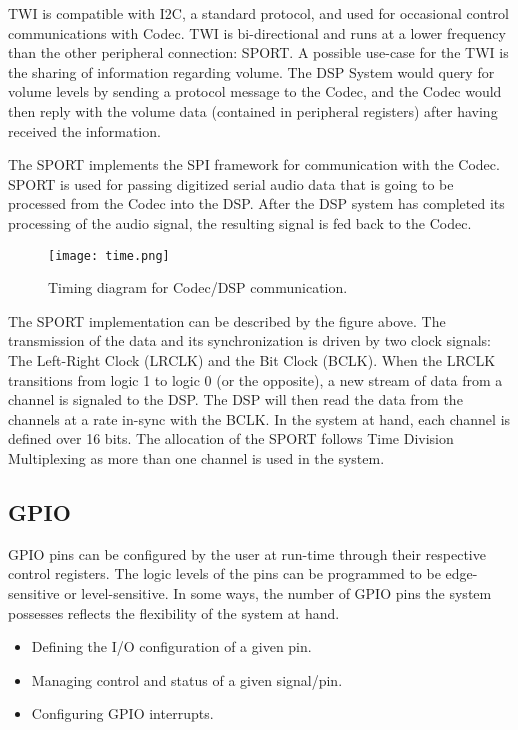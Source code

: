 TWI is compatible with I2C, a standard protocol, and used for occasional control communications with Codec. TWI is bi-directional and runs at a lower frequency than the other peripheral connection: SPORT. 
A possible use-case for the TWI is the sharing of information regarding volume. The DSP System would query for volume levels by sending a protocol message to the Codec, and the Codec would then reply with the volume data (contained in peripheral registers) after having received the information.

The SPORT implements the SPI framework for communication with the Codec. SPORT is used for passing digitized serial audio data that is going to be processed from the Codec into the DSP. After the DSP system has completed its processing of the audio signal, the resulting signal is fed back to the Codec. 


\begin{figure}[h!]
	\centering
	\texttt{[image: time.png]}
	\caption{Timing diagram for Codec/DSP communication.}
	\label{fig:timing}
	
\end{figure}

The SPORT implementation can be described by the figure above. The transmission of the data and its synchronization is driven by two clock signals: The Left-Right Clock (LRCLK) and the Bit Clock (BCLK). When the LRCLK transitions from logic 1 to logic 0 (or the opposite), a new stream of data from a channel is signaled to the DSP. The DSP will then read the data from the channels at a rate in-sync with the BCLK. In the system at hand, each channel is defined over 16 bits. The allocation of the SPORT follows Time Division Multiplexing as more than one channel is used in the system. 


\subsection{GPIO}
GPIO pins can be configured by the user at run-time through their respective control registers. The logic levels of the pins can be programmed to be edge-sensitive or level-sensitive. In some ways, the number of GPIO pins the system possesses reflects the flexibility of the system at hand. 


\begin{itemize}
	\setlength\itemsep{0.1em}
	\item Defining the I/O configuration of a given pin. 
	\item Managing control and status of a given signal/pin. 
	\item Configuring GPIO interrupts. 
\end{itemize}




